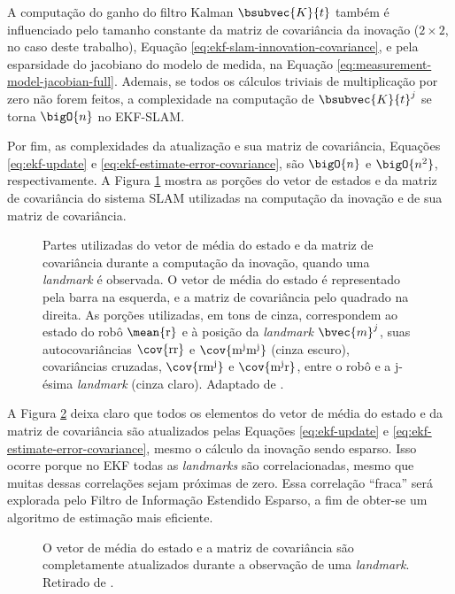 A computação do ganho do filtro Kalman $\bsubvec{K}{t}$ também é influenciado pelo 
tamanho constante da matriz de covariância da inovação ($2\times 2$, no caso deste trabalho), Equação \ref{eq:ekf-slam-innovation-covariance}, e pela esparsidade do jacobiano do modelo de medida, na Equação \ref{eq:measurement-model-jacobian-full}. Ademais, se todos os cálculos triviais de multiplicação por zero não forem feitos, a complexidade na computação de $\bsubvec{K}{t}^j$ se torna $\bigO{n}$ no EKF-SLAM.

Por fim, as complexidades da atualização e sua matriz de covariância, Equações \ref{eq:ekf-update} e \ref{eq:ekf-estimate-error-covariance}, são $\bigO{n}$ e $\bigO{n^2}$, respectivamente. A Figura \ref{fig:ekf-slam-innovation} mostra as porções 
do vetor de estados e da matriz de covariância do sistema SLAM utilizadas na computação da inovação e de sua matriz de covariância.

\begin{figure}[h]
  \centering
  
  \caption{Partes utilizadas do vetor de média do estado e da matriz de covariância durante a computação da inovação, quando uma \textit{landmark} é observada. O vetor de média do estado é representado pela barra na esquerda, e a matriz de covariância pelo quadrado na direita. As porções utilizadas, em tons de cinza, correspondem ao estado do robô $\mean{\mathrm{r}}$ e à posição da \textit{landmark} $\bvec{m}^j$, suas autocovariâncias $\cov{\mathrm{rr}}$ e $\cov{\mathrm{m^j m^j}}$ (cinza escuro),  covariâncias cruzadas, $\cov{\mathrm{r m^j}}$ e $\cov{\mathrm{m^j r}}$, entre o robô e a j-ésima \textit{landmark} (cinza claro). Adaptado de \cite[p.~8]{jsola}.}
  \label{fig:ekf-slam-innovation}
\end{figure}

A Figura \ref{fig:ekf-slam-update} deixa claro que todos os elementos do vetor de média do estado e da 
matriz de covariância são atualizados pelas Equações \ref{eq:ekf-update} e \ref{eq:ekf-estimate-error-covariance}, mesmo o cálculo da inovação sendo esparso. Isso ocorre porque no EKF todas as \textit{landmarks} são 
correlacionadas, mesmo que muitas dessas correlações sejam próximas de zero. 
Essa correlação ``fraca'' será explorada pelo Filtro de Informação Estendido Esparso, a fim de obter-se um algoritmo de estimação mais eficiente.

\begin{figure}[h]
  \centering
  
  \caption{O vetor de média do estado e a matriz de covariância são completamente atualizados durante a observação de uma \textit{landmark}. Retirado de \cite[p.~8]{jsola}.}
  \label{fig:ekf-slam-update}
\end{figure}

